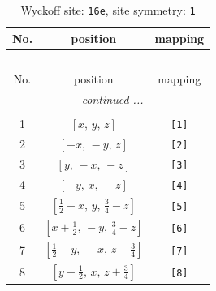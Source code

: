\documentclass[fleqn,8pt]{jsarticle}
\begin{document}
\renewcommand{\arraystretch}{1.2}
\begin{longtable}{ccc}
\caption{Wyckoff site: {\tt 16e}, site symmetry: {\tt 1}}
 \\
 \hline \hline
No. & position & mapping \\ \hline \endfirsthead

\multicolumn{2}{l}{\tablename\ \thetable{}} \\
 \hline \hline
No. & position & mapping \\ \hline \endhead

 \hline \hline
\multicolumn{2}{r}{\footnotesize\it continued ...} \\ \endfoot

 \hline \hline
\multicolumn{2}{r}{} \\ \endlastfoot

1 & $\left[ x,\, y,\, z \right]$ & {\tt [1]} \\ \hline
2 & $\left[ - x,\, - y,\, z \right]$ & {\tt [2]} \\ \hline
3 & $\left[ y,\, - x,\, - z \right]$ & {\tt [3]} \\ \hline
4 & $\left[ - y,\, x,\, - z \right]$ & {\tt [4]} \\ \hline
5 & $\left[ \frac{1}{2} - x,\, y,\, \frac{3}{4} - z \right]$ & {\tt [5]} \\ \hline
6 & $\left[ x + \frac{1}{2},\, - y,\, \frac{3}{4} - z \right]$ & {\tt [6]} \\ \hline
7 & $\left[ \frac{1}{2} - y,\, - x,\, z + \frac{3}{4} \right]$ & {\tt [7]} \\ \hline
8 & $\left[ y + \frac{1}{2},\, x,\, z + \frac{3}{4} \right]$ & {\tt [8]} \\
\end{longtable}
\end{document}

